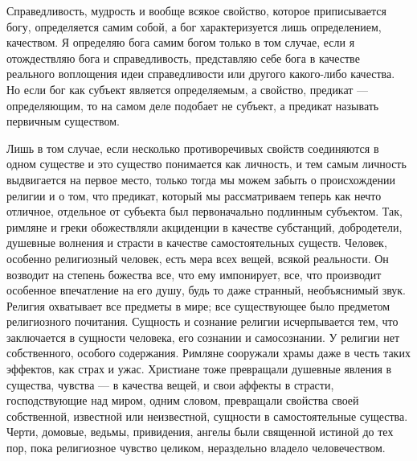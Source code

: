 \documentclass[12pt,oneside]{book}
\begin{document}
Справедливость, мудрость и вообще всякое свойство, которое приписывается богу, определяется самим собой, а бог характеризуется лишь определением, качеством. Я определяю бога самим богом только в том случае, если я отождествляю бога и справедливость, представляю себе бога в качестве реального воплощения идеи справедливости или другого какого-либо качества. Но если бог как субъект является определяемым, а свойство, предикат --- определяющим, то на самом деле подобает не субъект, а предикат называть первичным существом.

Лишь в том случае, если несколько противоречивых свойств соединяются в одном существе и это существо понимается как личность, и тем самым личность выдвигается на первое место, только тогда мы можем забыть о происхождении религии и о том, что предикат, который мы рассматриваем теперь как нечто отличное, отдельное от субъекта был первоначально подлинным субъектом. Так, римляне и греки обожествляли акциденции в качестве субстанций, добродетели, душевные волнения и страсти в качестве самостоятельных существ. Человек, особенно религиозный человек, есть мера всех вещей, всякой реальности. Он возводит на степень божества все, что ему импонирует, все, что производит особенное впечатление на его душу, будь то даже странный, необъяснимый звук. Религия охватывает все предметы в мире; все существующее было предметом религиозного почитания. Сущность и сознание религии исчерпывается тем, что заключается в сущности человека, его сознании и самосознании. У религии нет собственного, особого содержания. Римляне сооружали храмы даже в честь таких эффектов, как страх и ужас. Христиане тоже превращали душевные явления в существа, чувства --- в качества вещей, и свои аффекты в страсти, господствующие над миром, одним словом, превращали свойства своей собственной, известной или неизвестной, сущности в самостоятельные существа. Черти, домовые, ведьмы, привидения, ангелы были священной истиной до тех пор, пока религиозное чувство целиком, нераздельно владело человечеством.
\end{document}
